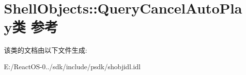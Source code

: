 \hypertarget{class_shell_objects_1_1_query_cancel_auto_play}{}\section{Shell\+Objects\+:\+:Query\+Cancel\+Auto\+Play类 参考}
\label{class_shell_objects_1_1_query_cancel_auto_play}


该类的文档由以下文件生成\+:\begin{DoxyCompactItemize}
\item 
E\+:/\+React\+O\+S-\/0../sdk/include/psdk/shobjidl.\+idl\end{DoxyCompactItemize}
